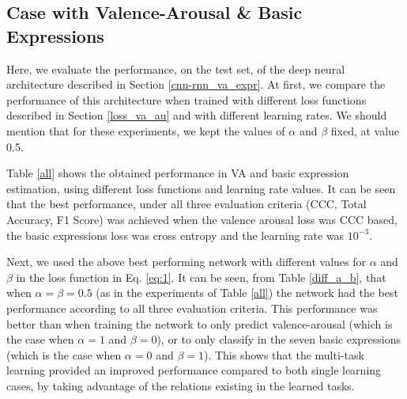 \documentclass[a4paper, 10pt, conference]{ieeeconf}      %
\begin{document}
\subsection{Case with Valence-Arousal \& Basic Expressions}


Here, we evaluate the performance, on the test set, of the deep neural architecture described in Section \ref{cnn-rnn_va_expr}. 
At first, we compare the performance of this architecture when trained with different loss functions described in Section \ref{loss_va_au} and with different learning rates. We should mention that for these experiments, we kept the values of $\alpha$ and $\beta$ fixed, at value 0.5.

Table \ref{all} shows the obtained performance in VA and basic expression estimation, using different loss functions and learning rate values. It can be seen that the best performance, under all three evaluation criteria (CCC, Total Accuracy, F1 Score) was achieved when the valence arousal loss was CCC based, the basic expressions loss was cross entropy and the learning rate was $10^{-3}$. 


Next, we used the above best performing network with different values for $\alpha$ and $\beta$ in the loss function in Eq. \ref{eq:1}. It can be seen, from Table \ref{diff_a_b}, that when $\alpha = \beta = 0.5$ (as in the experiments of Table \ref{all}) the network had the best performance according to all three evaluation criteria. This performance was better than when training the network to only predict valence-arousal (which is the case when $\alpha=1$ and $\beta=0$), or to only classify in the seven basic expressions (which is the case when $\alpha=0$ and $\beta=1$). This shows that the multi-task learning provided an improved performance compared to both single learning cases, by taking advantage of the relations existing in the learned tasks.
\end{document}
